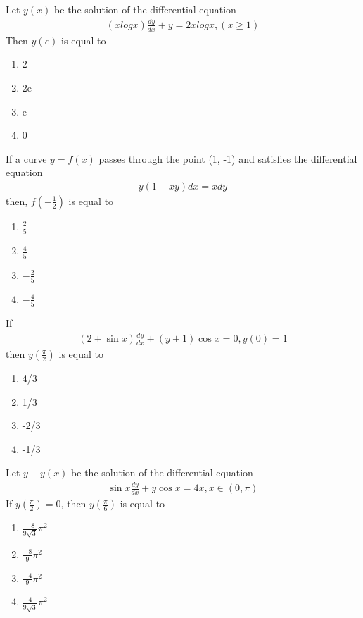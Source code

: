 \item Let $y(x)$ be the solution of the differential equation
\begin{align*}
(xlogx)\frac{dy}{dx} + y = 2x logx, (x \geq 1)
\end{align*}
Then $y(e)$ is equal to
\begin{enumerate}
\item 2
\item 2e
\item e
\item 0
\end{enumerate}

\item If a curve $y = f(x)$ passes through the point (1, -1) and satisfies the differential equation 
\begin{align*}
y(1 + xy)dx = xdy
\end{align*}
then, $f\left(-\frac{1}{2}\right)$ is equal to
\begin{enumerate}
\item $\frac{2}{5}$
\item $\frac{4}{5}$
\item $-\frac{2}{5}$
\item $-\frac{4}{5}$
\end{enumerate}

\item If
\begin{align*}
(2 + \sin x)\frac{dy}{dx} + (y + 1)\cos x = 0, y(0) = 1
\end{align*}
then $y\left(\frac{\pi}{2}\right)$ is equal to
\begin{enumerate}
\item 4/3
\item 1/3
\item -2/3
\item -1/3
\end{enumerate}

\item Let $y - y(x)$ be the solution of the differential equation
\begin{align*}
\sin x\frac{dy}{dx} + y\cos x = 4x, x \in (0, \pi)
\end{align*}
If $y\left(\frac{\pi}{2}\right) = 0$, then $y\left(\frac{\pi}{6}\right)$ is equal to
\begin{enumerate}
\item $\frac{-8}{9\sqrt{3}}\pi^{2}$
\item $\frac{-8}{9}\pi^{2}$
\item $\frac{-4}{9}\pi^{2}$
\item $\frac{4}{9\sqrt{3}}\pi^{2}$
\end{enumerate}


